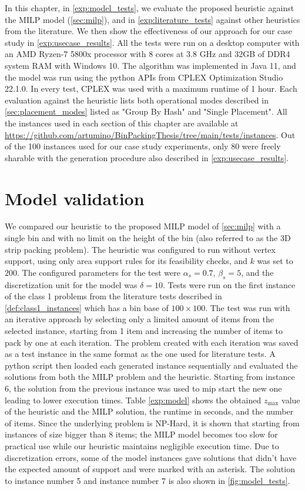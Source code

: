 In this chapter, in \cref{exp:model_tests}, we evaluate the proposed heuristic against the MILP model (\ref{sec:milp}), and in \cref{exp:literature_tests} against other heuristics from the literature. We then show the effectiveness of our approach for our case study in \cref{exp:usecase_results}.
All the tests were run on a desktop computer with an AMD Ryzen-7 5800x processor with 8 cores at 3.8 GHz and 32GB of DDR4 system RAM with Windows 10. The algorithm was implemented in Java 11, and the model was run using the python APIs from CPLEX Optimization Studio 22.1.0.
In every test, CPLEX was used with a maximum runtime of 1 hour.
Each evaluation against the heuristic lists both operational modes described in \cref{sec:placement_modes} listed as "Group By Hash" and "Single Placement".
All the instances used in each section of this chapter are available at \url{https://github.com/artumino/BinPackingThesis/tree/main/tests/instances}.
Out of the 100 instances used for our case study experiments, only 80 were freely sharable with the generation procedure also described in \cref{exp:usecase_results}.

\section{Model validation}
We compared our heuristic to the proposed MILP model of \cref{sec:milp} with a single bin and with no limit on the height of the bin (also referred to as the 3D strip packing problem).
The heuristic was configured to run without vertex support, using only area support rules for its feasibility checks, and $k$ was set to $200$.
The configured parameters for the test were $\alpha_s = 0.7$, $\beta_s = 5$, and the discretization unit for the model was $\delta = 10$. 
Tests were run on the first instance of the class 1 problems from the literature tests described in \cref{def:class1_instances} which has a bin base of $100 \times 100$.
The test was run with an iterative approach by selecting only a limited amount of items from the selected instance, starting from 1 item and increasing the number of items to pack by one at each iteration.
The problem created with each iteration was saved as a test instance in the same format as the one used for literature tests. A python script then loaded each generated instance sequentially and evaluated the solutions from both the MILP problem and the heuristic.
Starting from instance 6, the solution from the previous instance was used to mip start the new one leading to lower execution times.
Table \ref{exp:model} shows the obtained $z_{\text{max}}$ value of the heuristic and the MILP solution, the runtime in seconds, and the number of items.
Since the underlying problem is NP-Hard, it is shown that starting from instances of size bigger than 8 items; the MILP model becomes too slow for practical use while our heuristic maintains negligible execution time.
Due to discretization errors, some of the model instances gave solutions that didn't have the expected amount of support and were marked with an asterisk.
The solution to instance number 5 and instance number 7 is also shown in \cref{fig:model_tests}.
\label{exp:model_tests}



